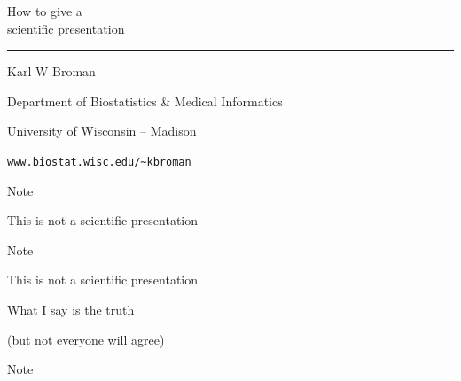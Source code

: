 \documentclass[12pt]{article}
\newcommand{\titlesize}{\fontsize{40}{50} \selectfont}
\newcommand{\headsize}{\fontsize{35}{35} \selectfont}
\newcommand{\textsize}{\fontsize{30}{35} \selectfont}
\newcommand{\smallersize}{\fontsize{20}{25} \selectfont}
\begin{document}
\thispagestyle{empty}

\begin{center}
\titlesize \color{myyellow}

\vspace*{25mm}

How to give a \\
scientific presentation

\color{mypink}
\rule{10in}{1mm}

\vspace{5mm}

\textsize \color{myblue}
Karl W Broman
\vspace{5mm}

{\smallersize Department of Biostatistics \& Medical Informatics

University of Wisconsin -- Madison
\vspace{20mm}


\verb|www.biostat.wisc.edu/~kbroman| 
}

\end{center}




\newpage

\headsize \color{myyellow}
\hfill \begin{minipage}{5.75in}
\centering
Note
\end{minipage}

\vspace{6cm} \color{mywhite} \textsize

\centerline{This is {\color{mypink} not} a scientific presentation}

\newpage

\headsize \color{myyellow}
\hfill \begin{minipage}{5.75in}
\centering
Note
\end{minipage}

\vspace{6cm} \color{mywhite} \textsize

\centerline{This is {\color{mypink} not} a scientific presentation}

\vspace{3cm}

\centerline{What I say is the {\color{mypink} truth}}

\centerline{\color{myblue} \smallersize (but not everyone will agree)}



\newpage

\headsize \color{myyellow}
\hfill \begin{minipage}{5.75in}
\centering
Note
\end{minipage}
\end{document}
